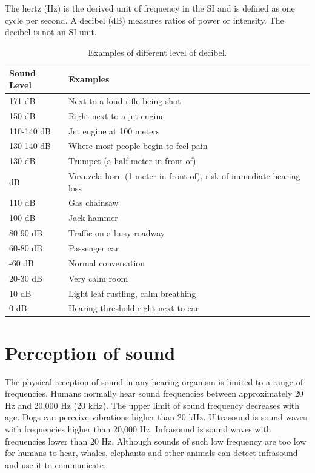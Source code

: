 \documentclass[]{book}
\begin{document}
The hertz (Hz) is the derived unit of frequency in the SI and is defined
as one cycle per second. A decibel (dB) measures ratios of power or
intensity. The decibel is not an SI unit.

\begin{table}[t]

\caption{\label{tab:db}Examples of different level of decibel.}
\centering
\begin{tabular}{ll}
\toprule
Sound Level & Examples\\
\midrule
171 dB & Next to a loud rifle being shot\\
150 dB & Right next to a jet engine\\
110-140 dB & Jet engine at 100 meters\\
130-140 dB & Where most people begin to feel pain\\
130 dB & Trumpet (a half meter in front of)\\
\addlinespace
120 dB & Vuvuzela horn (1 meter in front of), risk of immediate hearing loss\\
110 dB & Gas chainsaw\\
100 dB & Jack hammer\\
80-90 dB & Traffic on a busy roadway\\
60-80 dB & Passenger car\\
\addlinespace
40-60 dB & Normal conversation\\
20-30 dB & Very calm room\\
10 dB & Light leaf rustling, calm breathing\\
0 dB & Hearing threshold right next to ear\\
\bottomrule
\end{tabular}
\end{table}

\section{Perception of sound}\label{perception-of-sound}

The physical reception of sound in any hearing organism is limited to a
range of frequencies. Humans normally hear sound frequencies between
approximately 20 Hz and 20,000 Hz (20 kHz). The upper limit of sound
frequency decreases with age. Dogs can perceive vibrations higher than
20 kHz. Ultrasound is sound waves with frequencies higher than 20,000
Hz. Infrasound is sound waves with frequencies lower than 20 Hz.
Although sounds of such low frequency are too low for humans to hear,
whales, elephants and other animals can detect infrasound and use it to
communicate.
\end{document}

